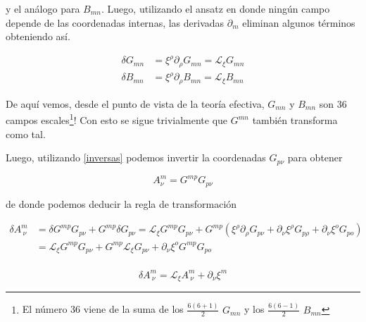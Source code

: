 \documentclass{article}
\numberwithin{equation}{section}
\begin{document}
y el análogo para $ B_{m n} $. Luego, utilizando el ansatz en donde ningún campo depende de las coordenadas internas, las derivadas $ \partial_m $ eliminan algunos términos obteniendo así.


\begin{boxquation}
	\begin{equation}\label{GyBscalars}
	\begin{aligned}
	\delta G_{m n} &= \xi^{\rho} \partial_{\rho} G_{m n} = \mathcal{L}_{\xi} G_{m n}\\
	\delta B_{m n} &= \xi^{\rho} \partial_{\rho} B_{m n} = \mathcal{L}_{\xi} B_{m n}
	\end{aligned}
	\end{equation}
\end{boxquation}


De aquí vemos, desde el punto de vista de la teoría efectiva, $ G_{m n} $ y $ B_{m n} $ son 36 campos escales\footnote{ El número 36 viene de la suma de los $ \frac{6(6+1)}{2} $ $ G_{m n} $ y los $ \frac{6(6-1)}{2} $ $ B_{m n} $}! Con esto se sigue trivialmente que $ G^{m n} $ también transforma como tal.

Luego, utilizando \ref{inversas} podemos invertir la coordenadas $ G_{p \nu} $ para obtener

\begin{equation}
A^m_{\nu} = G^{m p} G_{p \nu}
\end{equation}

de donde podemos deducir la regla de transformación 

\begin{equation*}
\begin{aligned}
\delta A^m_{\ \nu} &= \delta G^{m p} G_{p \nu} + G^{m p} \delta G_{p \nu} = \mathcal{L}_{\xi} G^{m p} G_{p \nu} + G^{m p} \left( \xi^{\rho} \partial_{\rho} G_{p \nu} + \partial_{\nu} \xi^{\rho} G_{p \rho} + \partial_{\nu} \xi^{o} G_{p o} \right)\\
&=\mathcal{L}_{\xi} G^{m p} G_{p \nu} + G^{m p} \mathcal{L}_{\xi} G_{p \nu} + \partial_{\nu} \xi^{o} G^{m p} G_{p o}\\
\end{aligned}
\end{equation*}

\begin{boxquation}
	\begin{equation}\label{A}
	\delta A^m_{\ \nu}= \mathcal{L}_{\xi} A^m_{\ \nu} + \partial_{\nu} \xi^m
	\end{equation}
\end{boxquation}
\end{document}
